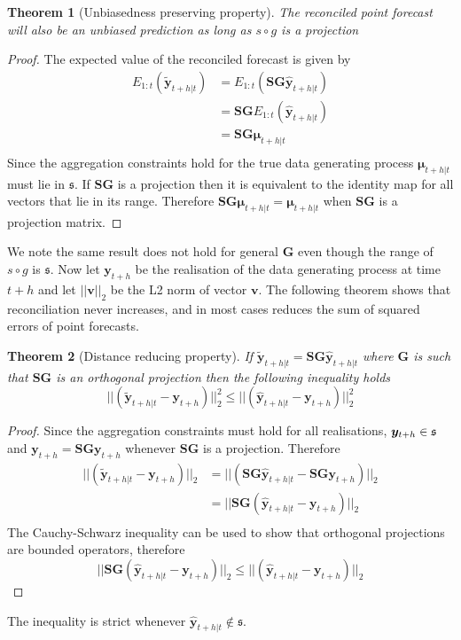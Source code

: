 \documentclass[a4paper, 11pt]{article}
\theoremstyle{theo}
\newtheorem{theo}{Theorem}[section]
\theoremstyle{definition}
\begin{document}
\begin{theo}[Unbiasedness preserving property]
  The reconciled point forecast will also be an unbiased prediction as long as $s\circ g$ is a projection 
\end{theo}
\begin{proof}
	The expected value of the reconciled forecast is given by
	\begin{align*}
	E_{1:t}\left(\tilde{\bm y}_{t+h|t}\right)&=E_{1:t}\left({\bm S}{\bm G}\hat{\bm y}_{t+h|t}\right)\\
	&={\bm S}{\bm G}E_{1:t}\left(\hat{\bm y}_{t+h|t}\right)\\
    &={\bm S}{\bm G}{\bm \mu}_{t+h|t}\\
	\end{align*}
	Since the aggregation constraints hold for the true data generating process ${\bm \mu}_{t+h|t}$ must lie in $\mathfrak{s}$.  If ${\bm S}{\bm G}$ is a projection then it is equivalent to the identity map for all vectors that lie in its range.  Therefore ${\bm S}{\bm G}{\bm \mu}_{t+h|t}={\bm \mu}_{t+h|t}$ when ${\bm S}{\bm G}$ is a projection matrix.
\end{proof}
We note the same result does not hold for general ${\bm G}$ even though the range of $s\circ g$ is $\mathfrak{s}$.  Now let ${\bm y}_{t+h}$ be the realisation of the data generating process at time $t+h$ and let $||{\bm v}||_2$ be the L2 norm of vector ${\bm v}$.  The following theorem shows that reconciliation never increases, and in most cases reduces the sum of squared errors of point forecasts.

\begin{theo}[Distance reducing property]
	If $\tilde{\bm y}_{t+h|t}={\bm S}{\bm G}\hat{\bm y}_{t+h|t}$ where ${\bm G}$ is such that ${\bm S}{\bm G}$ is an orthogonal projection then the following inequality holds
	  \begin{equation}
	    ||(\tilde{\bm y}_{t+h|t}-{\bm y}_{t+h})||^2_2\le||(\hat{\bm y}_{t+h|t}-{\bm y}_{t+h})||^2_2
	  \end{equation}
\end{theo}
\begin{proof}
	Since the aggregation constraints must hold for all realisations, ${\bm y}_{t+h}\in\frak{s}$ and ${\bm y}_{t+h}={\bm S}{\bm G}{\bm y}_{t+h}$ whenever ${\bm S}{\bm G}$ is a projection.  Therefore 
	\begin{align}
	||(\tilde{\bm y}_{t+h|t}-{\bm y}_{t+h})||_2&=||({\bm S}{\bm G}\hat{\bm y}_{t+h|t}-{\bm S}{\bm G}{\bm y}_{t+h})||_2\\
	&=||{\bm S}{\bm G}(\hat{\bm y}_{t+h|t}-{\bm y}_{t+h})||_2\\
	\end{align}
	The Cauchy-Schwarz inequality can be used to show that orthogonal projections are bounded operators, therefore
	 \begin{equation*}
	 ||{\bm S}{\bm G}(\hat{\bm y}_{t+h|t}-{\bm y}_{t+h})||_2\le
	 ||(\hat{\bm y}_{t+h|t}-{\bm y}_{t+h})||_2
	 \end{equation*}
\end{proof}
The inequality is strict whenever $\hat{\bm y}_{t+h|t}\notin\mathfrak{s}$.
\end{document}

